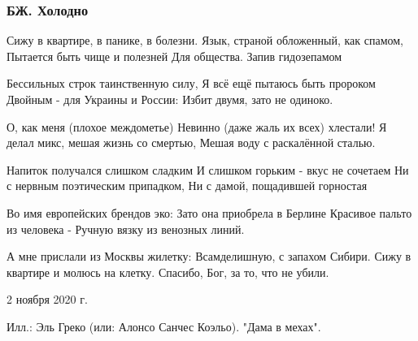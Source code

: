  
 
 

\subsubsection{БЖ. Холодно}

Сижу в квартире, в панике, в болезни.
Язык, страной обложенный, как спамом,
Пытается быть чище и полезней
Для общества. Запив гидозепамом

Бессильных строк таинственную силу,
Я всё ещё пытаюсь быть пророком
Двойным - для Украины и России:
Избит двумя, зато не одиноко.

О, как меня (плохое междометье)
Невинно (даже жаль их всех) хлестали!
Я делал микс, мешая жизнь со смертью,
Мешая воду с раскалённой сталью.

Напиток получался слишком сладким
И слишком горьким - вкус не сочетаем
Ни с нервным поэтическим припадком,
Ни с дамой, пощадившей горностая

Во имя европейских брендов эко:
Зато она приобрела в Берлине
Красивое пальто из человека -
Ручную вязку из венозных линий.

А мне прислали из Москвы жилетку:
Всамделишную, с запахом Сибири.
Сижу в квартире и молюсь на клетку.
Спасибо, Бог, за то, что не убили.

2 ноября 2020 г. 

Илл.: Эль Греко (или: Алонсо Санчес Коэльо). "Дама в мехах".
